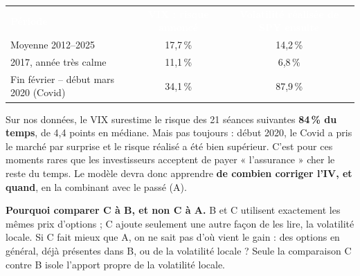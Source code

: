 \documentclass[10pt,a4paper]{article}
\newcommand{\entete}[1]{\textcolor{white}{\bfseries #1}}
\begin{document}
{\small
\begin{center}
\begin{tabular}{@{}l c c@{}}
\rowcolor{marine}\entete{Période} & \entete{VIX : risque annoncé} & \entete{Volatilité réalisée de SPY ensuite} \\
Moyenne 2012–2025 & 17,7\,\% & 14,2\,\% \\
\rowcolor{gris}2017, année très calme & 11,1\,\% & 6,8\,\% \\
Fin février – début mars 2020 (Covid) & 34,1\,\% & 87,9\,\% \\
\end{tabular}
\end{center}}
Sur nos données, le VIX surestime le risque des 21 séances suivantes \textbf{84\,\% du temps}, de 4,4 points en médiane. Mais pas toujours : début 2020, le Covid a pris le marché par surprise et le risque réalisé a été bien supérieur. C'est pour ces moments rares que les investisseurs acceptent de payer « l'assurance » cher le reste du temps. Le modèle devra donc apprendre \textbf{de combien corriger l'IV, et quand}, en la combinant avec le passé (A).

\textbf{Pourquoi comparer C à B, et non C à A.} B et C utilisent exactement les mêmes prix d'options ; C ajoute seulement une autre façon de les lire, la volatilité locale. Si C fait mieux que A, on ne sait pas d'où vient le gain : des options en général, déjà présentes dans B, ou de la volatilité locale ? Seule la comparaison C contre B isole l'apport propre de la volatilité locale.

\end{document}
